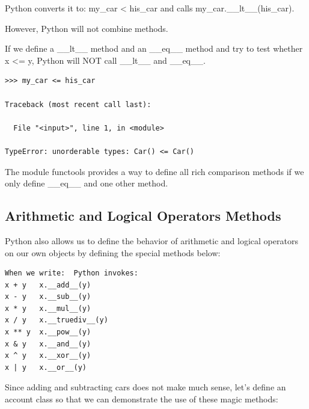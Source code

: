\documentclass{article}
\begin{document}
Python converts it to: my{\_}car < his{\_}car and calls my{\_}car.{\_}{\_}lt{\_}{\_}(his{\_}car).

However, Python will not combine methods.

If we define a {\_}{\_}lt{\_}{\_} method and an {\_}{\_}eq{\_}{\_} method and try to test whether x <= y, Python will NOT call {\_}{\_}lt{\_}{\_} and {\_}{\_}eq{\_}{\_}. 

\begin{lstlisting}
>>> my_car <= his_car

Traceback (most recent call last):

  File "<input>", line 1, in <module>

TypeError: unorderable types: Car() <= Car()
\end{lstlisting}

The module functools provides a way to define all rich comparison methods if we only define {\_}{\_}eq{\_}{\_} and one other method.

\subsection{Arithmetic and Logical Operators Methods}

Python also allows us to define the behavior of arithmetic and logical operators on our own objects by defining the special methods below:

\begin{lstlisting}
When we write:	Python invokes:
x + y	x.__add__(y)
x - y	x.__sub__(y)
x * y	x.__mul__(y)
x / y	x.__truediv__(y)
x ** y	x.__pow__(y)
x & y	x.__and__(y)
x ^ y	x.__xor__(y)
x | y	x.__or__(y)
\end{lstlisting}

Since adding and subtracting cars does not make much sense, let's define an account class so that we can demonstrate the use of these magic methods:
\end{document}
